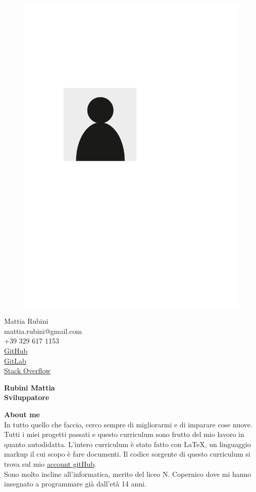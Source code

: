\documentclass[a4paper,12pt,final]{memoir}
\newcommand{\Sep}{\vspace{1.5em}}
\newenvironment{AboutMe}
	{\ignorespaces\textbf{\color{RoyalBlue} About me}}
	{\Sep\ignorespacesafterend}
\begin{document}
\begin{figure}
	\hfill
	\includegraphics[width=0.6\columnwidth]{photo}
	\vspace{-7cm}
\end{figure}

\begin{flushright}\small
	Mattia Rubini \\
	mattia.rubini@gmail.com \\
	+39 329 617 1153 \\
	\href{https://github.com/Mot93}{GitHub}\\
	\href{https://gitlab.com/mattia.rubini}{GitLab}\\
	\href{https://stackoverflow.com/users/6875945/mattia-rubini}{Stack Overflow}
\end{flushright}\normalsize
\framebreak


\Huge\bfseries {\color{RoyalBlue} Rubini Mattia} \\
\Large\bfseries  Sviluppatore \\

\normalsize\normalfont

\begin{AboutMe}
	\\In tutto quello che faccio, cerco sempre di migliorarmi e di imparare cose nuove.
	Tutti i miei progetti passati e questo curriculum sono frutto del mio lavoro in quanto autodidatta.
	L'intero curriculum è stato fatto con \LaTeX, un linguaggio markup il cui scopo è fare documenti.
	Il codice sorgente di questo curriculum si trova sul mio \href{https://github.com/Mot93}{account gitHub}.\\
	Sono molto incline all'informatica, merito del liceo N. Copernico dove mi hanno insegnato a programmare già dall'età 14 anni.
\end{AboutMe}
\end{document}
